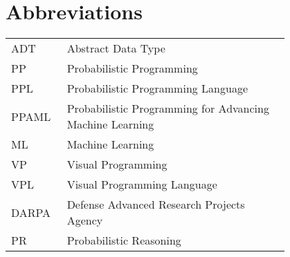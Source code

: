 \chapter*{Abbreviations}

\begin{flushleft}
\begin{tabular}{l p{0.8\linewidth}}
ADT      & Abstract Data Type\\
PP       & Probabilistic Programming\\
PPL      & Probabilistic Programming Language\\
PPAML    & Probabilistic Programming for Advancing Machine Learning\\
ML       & Machine Learning\\
VP       & Visual Programming\\
VPL      & Visual Programming Language\\
DARPA    & Defense Advanced Research Projects Agency\\
PR       & Probabilistic Reasoning
\end{tabular}
\end{flushleft}
